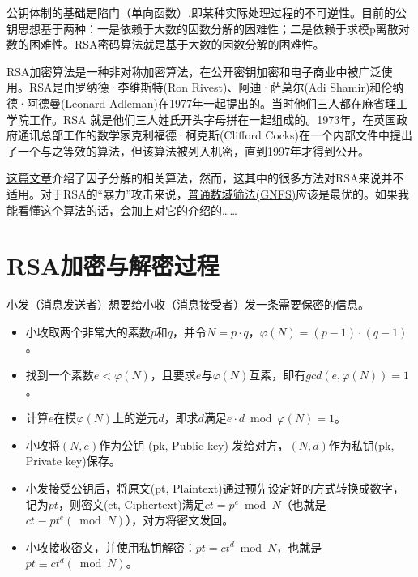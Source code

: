 \documentclass[a4paper]{article}         %
\newcommand{\upcite}[1]{\textsuperscript{\cite{#1}}} %
\begin{document}
公钥体制的基础是陷门（单向函数）,即某种实际处理过程的不可逆性。目前的公钥思想基于两种：一是依赖于大数的因数分解的困难性；二是依赖于求模p离散对数的困难性。RSA密码算法就是基于大数的因数分解的困难性\upcite{chenchuanbo2006rsa}。

RSA加密算法是一种非对称加密算法，在公开密钥加密和电子商业中被广泛使用。RSA是由罗纳德·李维斯特(Ron Rivest)、阿迪·萨莫尔(Adi Shamir)和伦纳德·阿德曼(Leonard Adleman)在1977年一起提出的。当时他们三人都在麻省理工学院工作。RSA 就是他们三人姓氏开头字母拼在一起组成的。1973年，在英国政府通讯总部工作的数学家克利福德·柯克斯(Clifford Cocks)在一个内部文件中提出了一个与之等效的算法，但该算法被列入机密，直到1997年才得到公开。

\href{https://mathmu.github.io/MTCAS/doc/IntegerFactorization.html}{这篇文章}介绍了因子分解的相关算法，然而，这其中的很多方法对RSA来说并不适用。对于RSA的“暴力”攻击来说，\href{https://zh.wikipedia.org/wiki/%E6%99%AE%E9%80%9A%E6%95%B0%E5%9F%9F%E7%AD%9B%E9%80%89%E6%B3%95}{普通数域筛法(GNFS)}应该是最优的。如果我能看懂这个算法的话，会加上对它的介绍的…… %

\section{RSA加密与解密过程} \label{RSA加密与解密过程}

小发（消息发送者）想要给小收（消息接受者）发一条需要保密的信息。

\begin{itemize}
	\item 小收取两个非常大的素数$p$和$q$，并令$N = p \cdot q$，$\varphi(N) = (p - 1) \cdot (q - 1)$。
	\item 找到一个素数$e < \varphi(N)$，且要求$e$与$\varphi(N)$互素，即有$gcd(e, \varphi(N)) = 1$。 %
	\item 计算$e$在模$\varphi(N)$上的逆元$d$，即求$d$满足$e \cdot d \bmod \varphi(N) = 1$。
	\item 小收将$(N, e)$作为公钥 (pk, Public key) 发给对方，$(N, d)$作为私钥(pk, Private key)保存。
	\item 小发接受公钥后，将原文(pt, Plaintext)通过预先设定好的方式转换成数字，记为$pt$，则密文(ct, Ciphertext)满足$ct = p ^ e \bmod N$（也就是$ct \equiv pt ^ e (\bmod N)$），对方将密文发回。
	\item 小收接收密文，并使用私钥解密：$pt = ct ^ d \bmod N$，也就是$pt \equiv ct ^ d (\bmod N)$。
\end{itemize}
\end{document}
